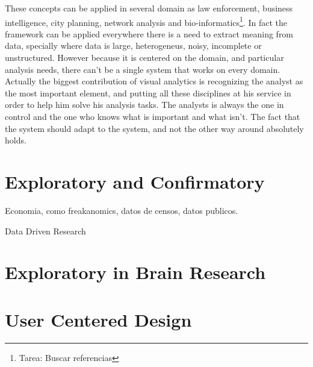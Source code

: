 These concepts can be applied in several domain as law enforcement, business intelligence, city planning, network analysis and bio-informatics\footnote{Tarea: Buscar referencias}. In fact the framework can be applied everywhere there is a need to extract meaning from data, specially where data is large, heterogeneus, noisy, incomplete or unstructured. However because it is centered on the domain, and particular analysis needs, there can't be a single system that works on every domain. Actually the biggest contribution of visual analytics is recognizing the analyst as the most important element, and putting all these disciplines at his service in order to help him solve his analysis tasks. The analysts is always the one in control and the one who knows what is important and what isn't. The fact that the system should adapt to the system, and not the other way around \autocite{norman_design_2002} absolutely holds. 


\section{Exploratory and Confirmatory}



Economia, como freakanomics, datos de censos, datos publicos.

Data Driven Research

\section{Exploratory in Brain Research}

\section{User Centered Design}
